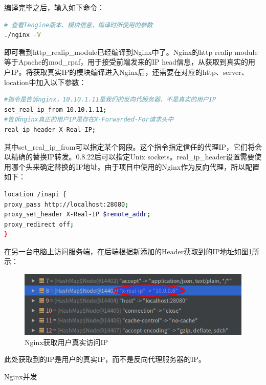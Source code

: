 \documentclass[11pt,fleqn]{book}
\makeatletter
\numberwithin{dummy}{section}
\theoremstyle{ocrenumbox}
\theoremstyle{blacknumex}
\theoremstyle{blacknumbox}
\theoremstyle{ocrenum}
\renewcommand{\subsection}{\@startsection {subsection}{2}{\z@}
	{-3ex \@plus -0.1ex \@minus -.4ex}
	{0.5ex \@plus.2ex }
	{\normalfont\sffamily\bfseries}}
\makeatother
\begin{document}
编译完毕之后，输入如下命令：

\begin{lstlisting}[language=bash]
# 查看Tengine版本、模块信息，编译时所使用的参数
./nginx -V
\end{lstlisting}

即可看到http\_realip\_module已经编译到Nginx中了。Nginx的http realip module等于Apache的mod\_rpaf，用于接受前端发来的IP head信息，从获取到真实的用户IP。将获取真实IP的模块编译进入Nginx后，还需要在对应的http、server、location中加入以下参数：

\begin{lstlisting}[language=bash]
#指令是告诉nginx，10.10.1.11是我们的反向代服务器，不是真实的用户IP
set_real_ip_from 10.10.1.11;
#告诉nginx真正的用户IP是存在X-Forwarded-For请求头中
real_ip_header X-Real-IP;
\end{lstlisting}

其中set\_real\_ip\_from可以指定某个网段。这个指令指定信任的代理IP，它们将会以精确的替换IP转发。0.8.22后可以指定Unix sockets。real\_ip\_header设置需要使用哪个头来确定替换的IP地址。由于项目中使用的Nginx作为反向代理，所以配置如下：

\begin{lstlisting}[language=bash]
location /inapi {
proxy_pass http://localhost:28080;
proxy_set_header X-Real-IP $remote_addr;
proxy_redirect off;
}
\end{lstlisting}

在另一台电脑上访问服务端，在后端根据新添加的Header获取到的IP地址如图\ref{fig:nginxgetrealip}所示：

\begin{figure}[htbp]
	\centering
	\includegraphics[scale=0.6]{nginxgetrealip.png}
	\caption{Nginx获取用户真实访问IP}
	\label{fig:nginxgetrealip}
\end{figure}

此处获取到的IP是用户的真实IP，而不是反向代理服务器的IP。

\subsection{Nginx并发}
\end{document}
